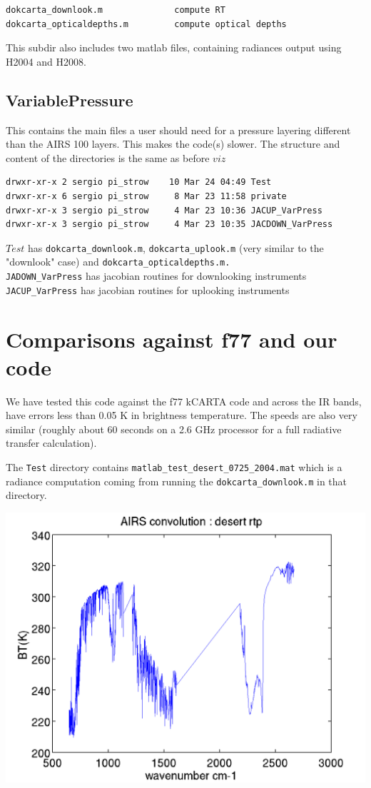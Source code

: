 \documentclass[11pt]{article}
\begin{document}
\begin{verbatim}
dokcarta_downlook.m              compute RT
dokcarta_opticaldepths.m         compute optical depths
\end{verbatim}

This subdir also includes two matlab files, containing radiances output
using H2004 and H2008.

\subsection{VariablePressure}
\label{sec-8-9}

This contains the main files a user should need for a pressure layering
different than the AIRS 100 layers. This makes the code(s) slower. The
structure and content of the directories is the same as before $viz$

\begin{verbatim}
drwxr-xr-x 2 sergio pi_strow    10 Mar 24 04:49 Test
drwxr-xr-x 6 sergio pi_strow     8 Mar 23 11:58 private
drwxr-xr-x 3 sergio pi_strow     4 Mar 23 10:36 JACUP_VarPress
drwxr-xr-x 3 sergio pi_strow     4 Mar 23 10:35 JACDOWN_VarPress
\end{verbatim}

$Test$ has \texttt{dokcarta\_downlook.m}, \texttt{dokcarta\_uplook.m} (very similar to
the "downlook" case) and \texttt{dokcarta\_opticaldepths.m.}\\

\texttt{JADOWN\_VarPress} has jacobian routines for downlooking instruments\\

\texttt{JACUP\_VarPress} has jacobian routines for uplooking instruments\\

\section{Comparisons against f77 and our code}
\label{sec-9}

We have tested this code against the f77 kCARTA code and across the IR
bands, have errors less than 0.05 K in brightness temperature. The
speeds are also very similar (roughly about 60 seconds on a 2.6 GHz
processor for a full radiative transfer calculation).

The \texttt{Test} directory contains \texttt{matlab\_test\_desert\_0725\_2004.mat} which
is a radiance computation coming from running the \texttt{dokcarta\_downlook.m}
in that directory.

\includegraphics[width=.9\linewidth]{./desert_rtp.png}
\end{document}
